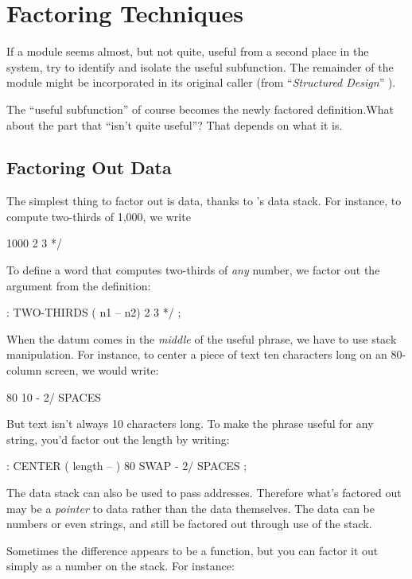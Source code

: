 \section{Factoring Techniques}

\begin{tfquot}
If a module seems almost, but not quite, useful from a second place in
the system, try to identify and isolate the useful subfunction. The
remainder of the module might be incorporated in its original caller
(from ``\emph{Structured Design}'' \cite{stevens74-6}).
\end{tfquot}
The ``useful subfunction'' of course becomes the newly factored
definition.What about the part that ``isn't quite useful''? That
depends on what it is.

\subsection{Factoring Out Data}
The simplest thing to factor out is data, thanks to \Forth{}'s data
stack. For instance, to compute two-thirds of 1,000, we write

\begin{Code}
1000 2 3 */
\end{Code}
To define a word that computes two-thirds of \emph{any} number,
we factor out the argument from the definition:

\begin{Code}
: TWO-THIRDS  ( n1 -- n2)  2 3 */ ;
\end{Code}
When the datum comes in the \emph{middle} of the useful phrase, we
have to use stack manipulation. For instance, to center a piece of
text ten characters long on an 80-column screen, we would write:

\begin{Code}
80  10 -   2/ SPACES
\end{Code}
But text isn't always 10 characters long. To make the phrase useful
for any string, you'd factor out the length by writing:

\begin{Code}
: CENTER ( length -- ) 80  SWAP -  2/ SPACES ;
\end{Code}
The data stack can also be used to pass addresses. Therefore what's
factored out may be a \emph{pointer} to data rather than the data
themselves. The data can be numbers or even strings, and still be
factored out through use of the stack.

Sometimes the difference appears to be a function, but you can factor
it out simply as a number on the stack. For instance:

